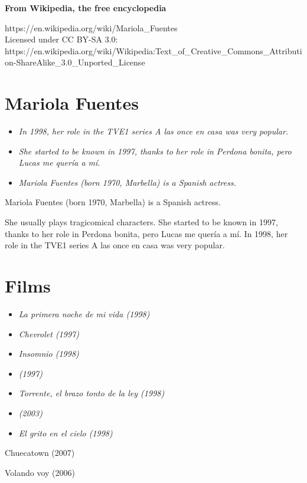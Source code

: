 \textbf{From Wikipedia, the free encyclopedia}

https://en.wikipedia.org/wiki/Mariola\_Fuentes\\
Licensed under CC BY-SA 3.0:\\
https://en.wikipedia.org/wiki/Wikipedia:Text\_of\_Creative\_Commons\_Attribution-ShareAlike\_3.0\_Unported\_License

\section{Mariola Fuentes}\label{mariola-fuentes}

\begin{itemize}
\item
  \emph{In 1998, her role in the TVE1 series A las once en casa was very
  popular.}
\item
  \emph{She started to be known in 1997, thanks to her role in Perdona
  bonita, pero Lucas me quería a mí.}
\item
  \emph{Mariola Fuentes (born 1970, Marbella) is a Spanish actress.}
\end{itemize}

Mariola Fuentes (born 1970, Marbella) is a Spanish actress.

She usually plays tragicomical characters. She started to be known in
1997, thanks to her role in Perdona bonita, pero Lucas me quería a mí.
In 1998, her role in the TVE1 series A las once en casa was very
popular.

\section{Films}\label{films}

\begin{itemize}
\item
  \emph{La primera noche de mi vida (1998)}
\item
  \emph{Chevrolet (1997)}
\item
  \emph{Insomnio (1998)}
\item
  \emph{(1997)}
\item
  \emph{Torrente, el brazo tonto de la ley (1998)}
\item
  \emph{(2003)}
\item
  \emph{El grito en el cielo (1998)}
\end{itemize}

Chuecatown (2007)

Volando voy (2006)

